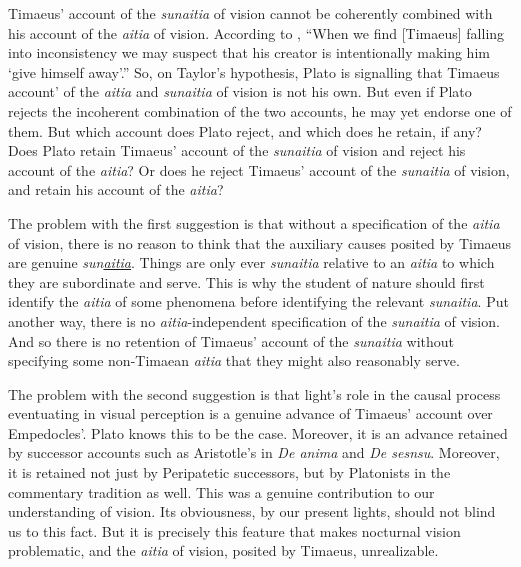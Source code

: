 Timaeus' account of the \emph{sunaitia} of vision cannot be coherently combined with his account of the \emph{aitia} of vision. According to \citet[614]{Taylor:1928qb}, ``When we find [Timaeus] falling into inconsistency we may suspect that his creator is intentionally making him `give himself away'.'' So, on Taylor's hypothesis, Plato is signalling that Timaeus account' of the \emph{aitia} and \emph{sunaitia} of vision is not his own. But even if Plato rejects the incoherent combination of the two accounts, he may yet endorse one of them. But which account does Plato reject, and which does he retain, if any? Does Plato retain Timaeus' account of the \emph{sunaitia} of vision and reject his account of the \emph{aitia}? Or does he reject Timaeus' account of the  \emph{sunaitia} of vision, and retain his account of the \emph{aitia}?

The problem with the first suggestion is that without a specification of the \emph{aitia} of vision, there is no reason to think that the auxiliary causes posited by Timaeus are genuine \emph{sun\underline{aitia}}. Things are only ever \emph{sunaitia} relative to an \emph{aitia} to which they are subordinate and serve. This is why the student of nature should first identify the \emph{aitia} of some phenomena before identifying the relevant \emph{sunaitia}. Put another way, there is no \emph{aitia}-independent specification of the \emph{sunaitia} of vision. And so there is no retention of Timaeus' account of the \emph{sunaitia} without specifying some non-Timaean \emph{aitia} that they might also reasonably serve.

The problem with the second suggestion is that light's role in the causal process eventuating in visual perception is a genuine advance of Timaeus' account over Empedocles'. Plato knows this to be the case. Moreover, it is an advance retained by successor accounts such as Aristotle's in \emph{De anima} and \emph{De sesnsu}. Moreover, it is retained not just by Peripatetic successors, but by Platonists in the commentary tradition as well. This was a genuine contribution to our understanding of vision. Its obviousness, by our present lights, should not blind us to this fact. But it is precisely this feature that makes nocturnal vision problematic, and the \emph{aitia} of vision, posited by Timaeus, unrealizable. 

